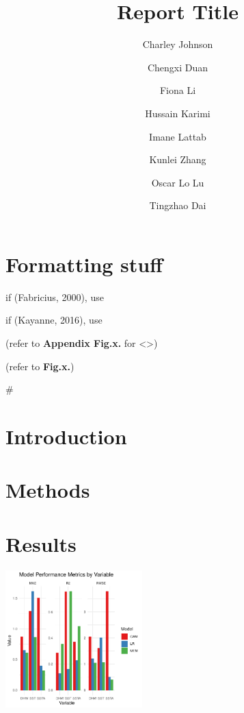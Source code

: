 \documentclass[letterpaper,9pt,twocolumn,twoside,]{pinp}
\title{Report Title}
\author[a]{Charley Johnson}
\author[b]{Chengxi Duan}
\author[c]{Fiona Li}
\author[d]{Hussain Karimi}
\author[e]{Imane Lattab}
\author[f]{Kunlei Zhang}
\author[g]{Oscar Lo Lu}
\author[h]{Tingzhao Dai}
\affil[a]{}
\affil[b]{}
\affil[c]{}
\affil[d]{}
\affil[e]{}
\affil[f]{}
\affil[g]{}
\affil[h]{}
\begin{document}
\verticaladjustment{-2pt}

\maketitle
\thispagestyle{firststyle}



\section{Formatting stuff}\label{formatting-stuff}

if (Fabricius, 2000), use \citep{fabricius2000biodiversity}

if (Kayanne, 2016), use \citep{kayanne2016validation}

(refer to \textbf{Appendix Fig.x.} for \textless\textgreater)

(refer to \textbf{Fig.x.})

\#\newpage

\section{Introduction}\label{introduction}

\section{Methods}\label{methods}

\section{Results}\label{results}

\begin{center}\includegraphics[width=1\linewidth,height=200px]{Reef03_FinalReport_files/figure-latex/unnamed-chunk-2-1} \end{center}
\end{document}
